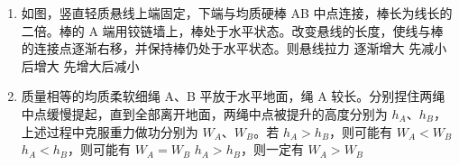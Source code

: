 \documentclass[\gkver]{gaokaozhenti}
\begin{document}
\begin{enumerate}
{在解这一类试题时，要考虑数值的合理性，如果本解中设 $t=0.1\Us$，则电流为 $I_{1}=3\UA$，这也符合实际，结果仍然是选项（D）正确。所以这种假设是可行的。当然题目的设计也要注意所给出数据的合理性。
}

\item
如图，竖直轻质悬线上端固定，下端与均质硬棒 AB 中点连接，棒长为线长的二倍。棒的 A 端用铰链墙上，棒处于水平状态。改变悬线的长度，使线与棒的连接点逐渐右移，并保持棒仍处于水平状态。则悬线拉力 
\onepicture[w=3.01cm]{}
{逐渐增大}
{先减小后增大}
{先增大后减小}

\item
质量相等的均质柔软细绳 A、B 平放于水平地面，绳 A 较长。分别捏住两绳中点缓慢提起，直到全部离开地面，两绳中点被提升的高度分别为 $h_{A}$、$h_{B}$，上述过程中克服重力做功分别为 $W_{A}$、$W_{B}$。若 
{$h_{A} > h_{B}$，则可能有 $W_{A} < W_{B}$}
{$h_{A} < h_{B}$，则可能有 $W_{A} = W_{B                        }$}
{$h_{A} > h_{B}$，则一定有 $W_{A} > W_{B}$}


\end{enumerate}
\end{document}
